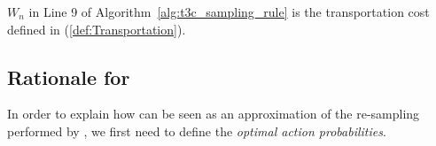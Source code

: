 $W_n$ in Line 9 of Algorithm~\ref{alg:t3c_sampling_rule} is the transportation cost defined in (\ref{def:Transportation}).


\subsection{Rationale for \TCC}

In order to explain how \TCC can be seen as an approximation of the re-sampling performed by \TTTS, we first need to define the \emph{optimal action probabilities}. 

